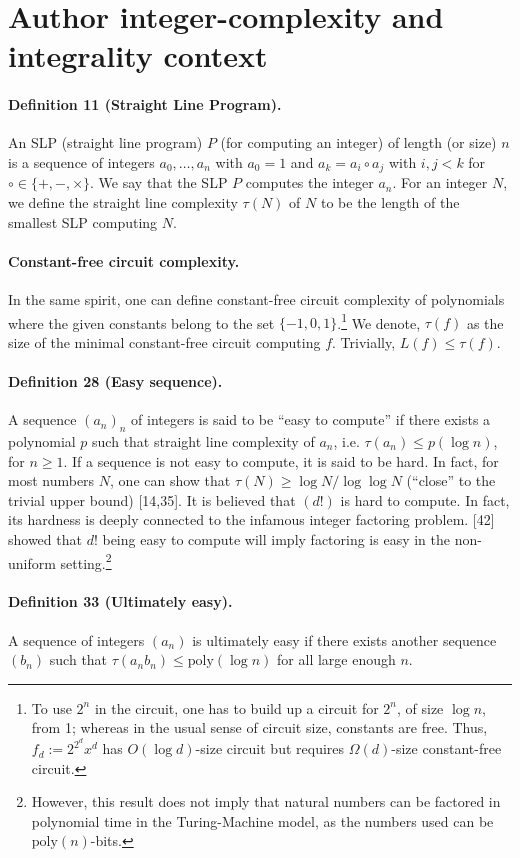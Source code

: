 \section*{Author integer-complexity and integrality context}
\paragraph{Definition 11 (Straight Line Program).} An SLP (straight line program) $P$ (for computing an integer) of length (or size) $n$ is a sequence of integers $a_0,\ldots,a_n$ with $a_0=1$ and $a_k=a_i\circ a_j$ with $i,j<k$ for $\circ\in\{+,-,\times\}$. We say that the SLP $P$ computes the integer $a_n$. For an integer $N$, we define the straight line complexity $\tau(N)$ of $N$ to be the length of the smallest SLP computing $N$.
\paragraph{Constant-free circuit complexity.} In the same spirit, one can define constant-free circuit complexity of polynomials where the given constants belong to the set $\{-1,0,1\}$.\footnote{To use $2^n$ in the circuit, one has to build up a circuit for $2^n$, of size $\log n$, from 1; whereas in the usual sense of circuit size, constants are free. Thus, $f_d:=2^{2^d}x^d$ has $O(\log d)$-size circuit but requires $\Omega(d)$-size constant-free circuit.} We denote, $\tau(f)$ as the size of the minimal constant-free circuit computing $f$. Trivially, $L(f)\le\tau(f)$.
\paragraph{Definition 28 (Easy sequence).} A sequence $(a_n)_n$ of integers is said to be ``easy to compute'' if there exists a polynomial $p$ such that straight line complexity of $a_n$, i.e. $\tau(a_n)\le p(\log n)$, for $n\ge1$. If a sequence is not easy to compute, it is said to be hard. In fact, for most numbers $N$, one can show that $\tau(N)\ge\log N/\log\log N$ (``close'' to the trivial upper bound) [14,35]. It is believed that $(d!)$ is hard to compute. In fact, its hardness is deeply connected to the infamous integer factoring problem. [42] showed that $d!$ being easy to compute will imply factoring is easy in the non-uniform setting.\footnote{However, this result does not imply that natural numbers can be factored in polynomial time in the Turing-Machine model, as the numbers used can be $\mathrm{poly}(n)$-bits.}
\paragraph{Definition 33 (Ultimately easy).} A sequence of integers $(a_n)$ is ultimately easy if there exists another sequence $(b_n)$ such that $\tau(a_nb_n)\le\mathrm{poly}(\log n)$ for all large enough $n$.
